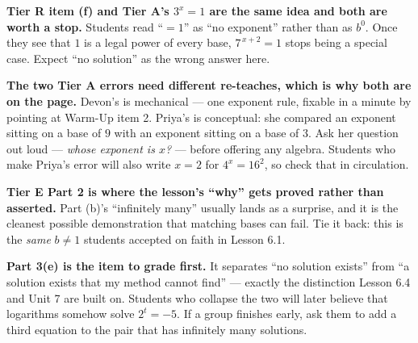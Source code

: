 \documentclass[10pt]{article}
\begin{document}
\begin{teachernote}
\textbf{Tier R item (f) and Tier A's $3^{x}=1$ are the same idea and both are worth a stop.} Students
read ``$=1$'' as ``no exponent'' rather than as $b^{0}$. Once they see that $1$ is a legal power of every
base, $7^{\,x+2}=1$ stops being a special case. Expect ``no solution'' as the wrong answer here.

\textbf{The two Tier A errors need different re-teaches, which is why both are on the page.} Devon's is
mechanical --- one exponent rule, fixable in a minute by pointing at Warm-Up item 2. Priya's is
conceptual: she compared an exponent sitting on a base of $9$ with an exponent sitting on a base of $3$.
Ask her question out loud --- \emph{whose exponent is $x$?} --- before offering any algebra. Students who
make Priya's error will also write $x=2$ for $4^{x}=16^{2}$, so check that in circulation.

\textbf{Tier E Part 2 is where the lesson's ``why'' gets proved rather than asserted.} Part (b)'s
``infinitely many'' usually lands as a surprise, and it is the cleanest possible demonstration that
matching bases can fail. Tie it back: this is the \emph{same} $b\neq1$ students accepted on faith in
Lesson 6.1.

\textbf{Part 3(e) is the item to grade first.} It separates ``no solution exists'' from ``a solution
exists that my method cannot find'' --- exactly the distinction Lesson 6.4 and Unit 7 are built on.
Students who collapse the two will later believe that logarithms somehow solve $2^{t}=-5$. If a group
finishes early, ask them to add a third equation to the pair that has infinitely many solutions.
\end{teachernote}
\end{document}
